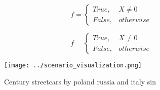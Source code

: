 \documentclass[a4paper]{article}
\begin{document}
\begin{equation}   f =
\begin{cases} True, & X \neq 0\\
False, & otherwise
\end{cases}
\end{equation}

\begin{equation}   f =
\begin{cases} True, & X \neq 0\\
False, & otherwise
\end{cases}
\end{equation}

\begin{figure}
\centering
\texttt{[image: ../scenario\_visualization.png]}
\caption{Century streetcars by poland russia and italy sin
}
\end{figure}
 
\end{document}
